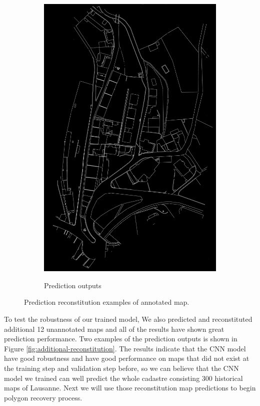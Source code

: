 \documentclass[12pt]{article}
\begin{document}
\begin{figure}[H]
\begin{subfigure}[b]{.32\textwidth}
		\includegraphics[width=1\linewidth]{images/original_prediction2.png}  
		\label{fig:original-pre}
		\caption{Prediction outputs}
	\end{subfigure}
	
	\caption{Prediction reconstitution examples of annotated map.}
	\label{fig:original-reconstitution}
\end{figure}


To test the robustness of our trained model, We also predicted and reconstituted additional 12 unannotated maps and all of the results have shown great prediction performance. Two examples of the prediction outputs is shown in Figure \ref{fig:additional-reconstitution}. The results indicate that the CNN model have good robustness and have good performance on maps that did not exist at the training step and validation step before, so we can believe that the CNN model we trained can well predict the whole cadastre consisting 300 historical maps of Lausanne. Next we will use those reconstitution map predictions to begin polygon recovery process.
\end{document}

